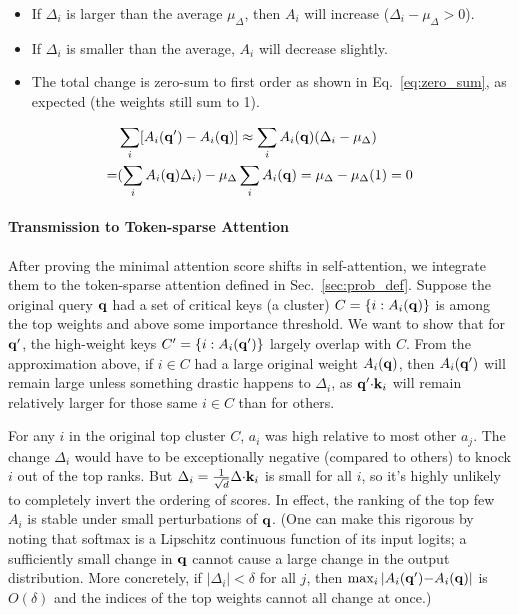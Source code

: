 \begin{itemize}[leftmargin=3mm]
    \item If $\Delta_i$ is larger than the average $\mu_\Delta$, then $A_i$ will increase ($\Delta_i - \mu_\Delta > 0$).
    \item If $\Delta_i$ is smaller than the average, $A_i$ will decrease slightly.
    \item The total change is zero-sum to first order as shown in Eq.~\eqref{eq:zero_sum}, as expected (the weights still sum to 1).
\end{itemize}
\begin{align}
\label{eq:zero_sum}
    &\sum_i [A_i(\mathbf{q}') - A_i(\mathbf{q})] \approx \sum_i A_i(\mathbf{q})(\Delta_i - \mu_\Delta) \nonumber \\ 
    = &(\sum_i A_i(\mathbf{q})\Delta_i) - \mu_\Delta\sum_i A_i(\mathbf{q}) =
    \mu_\Delta - \mu_\Delta(1) = 0
\end{align}

\paragraph{Transmission to Token-sparse Attention}

After proving the minimal attention score shifts in self-attention, we integrate them to the token-sparse attention defined in Sec.~\ref{sec:prob_def}. Suppose the original query $\mathbf{q}$ had a set of critical keys (a cluster) $C = \{i : A_i(\mathbf{q})\}$ is among the top weights and above some importance threshold. We want to show that for $\mathbf{q}'$, the high-weight keys $C' = \{i : A_i(\mathbf{q}')\}$ largely overlap with $C$. From the approximation above, if $i {\in} C$ had a large original weight $A_i(\mathbf{q})$, then $A_i(\mathbf{q}')$ will remain large unless something drastic happens to $\Delta_i$, as $\mathbf{q}'{\cdot} \mathbf{k}_i$ will remain relatively larger for those same $i{\in}C$ than for others.

For any $i$ in the original top cluster $C$, $a_i$ was high relative to most other $a_j$. The change $\Delta_i$ would have to be exceptionally negative (compared to others) to knock $i$ out of the top ranks. But $\Delta_i = \frac{1}{\sqrt{d}}\Delta {\cdot} \mathbf{k}_i$ is small for all $i$, so it’s highly unlikely to completely invert the ordering of scores. In effect, the ranking of the top few $ A_i$ is stable under small perturbations of $\mathbf{q}$. (One can make this rigorous by noting that softmax is a Lipschitz continuous function of its input logits; a sufficiently small change in $\mathbf{q}$ cannot cause a large change in the output distribution. More concretely, if $| \Delta_i | < \delta$ for all $j$, then $\max_i |A_i(\mathbf{q}') {-} A_i(\mathbf{q})|$ is $O(\delta)$ and the indices of the top weights cannot all change at once.) 

